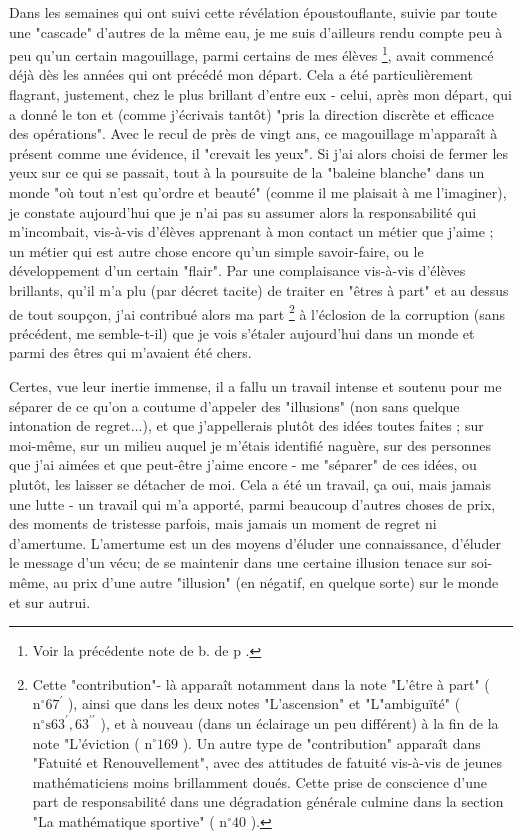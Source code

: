 Dans les semaines qui ont suivi cette révélation époustouflante, suivie par toute une "cascade" d'autres de la même eau, je me suis d'ailleurs rendu compte peu à peu qu'un certain magouillage, parmi certains de mes élèves \footnote{Voir la précédente note de b. de p .}, avait commencé déjà dès les années qui ont précédé mon départ. Cela a été particulièrement flagrant, justement, chez le plus brillant d'entre eux - celui, après mon départ, qui a donné le ton et (comme j'écrivais tantôt) "pris la direction discrète et efficace des opérations". Avec le recul de près de vingt ans, ce magouillage m'apparaît à présent comme une évidence, il "crevait les yeux". Si j'ai alors choisi de fermer les yeux sur ce qui se passait, tout à la poursuite de la "baleine blanche" dans un monde "où tout n'est qu'ordre et beauté" (comme il me plaisait à me l'imaginer), je constate aujourd'hui que je n'ai pas su assumer alors la responsabilité qui m'incombait, vis-à-vis d'élèves apprenant à mon contact un métier que j'aime ; un métier qui est autre chose encore qu'un simple savoir-faire, ou le développement d'un certain "flair". Par une complaisance vis-à-vis d'élèves brillants, qu'il m'a plu (par décret tacite) de traiter en "êtres à part" et au dessus de tout soupçon, j'ai contribué alors ma part \footnote{Cette "contribution"- là apparaît notamment dans la note "L'être à part" ( $\mathrm{n}^{\circ} 67^{\prime}$ ), ainsi que dans les deux notes "L'ascension" et "L"ambiguïté" ( $\mathrm{n}^{\circ} \mathrm{s} 63^{\prime}, 63^{\prime \prime}$ ), et à nouveau (dans un éclairage un peu différent) à la fin de la note "L'éviction ( $\mathrm{n}^{\circ} 169$ ). Un autre type de "contribution" apparaît dans "Fatuité et Renouvellement", avec des attitudes de fatuité vis-à-vis de jeunes mathématiciens moins brillamment doués. Cette prise de conscience d'une part de responsabilité dans une dégradation générale culmine dans la section "La mathématique sportive" ( $\mathrm{n}^{\circ} 40$ ).} à l'éclosion de la corruption (sans précédent, me semble-t-il) que je vois s'étaler aujourd'hui dans un monde et parmi des êtres qui m'avaient été chers.

Certes, vue leur inertie immense, il a fallu un travail intense et soutenu pour me séparer de ce qu'on a coutume d'appeler des "illusions" (non sans quelque intonation de regret...), et que j'appellerais plutôt des idées toutes faites ; sur moi-même, sur un milieu auquel je m'étais identifié naguère, sur des personnes que j'ai aimées et que peut-être j’aime encore - me "séparer" de ces idées, ou plutôt, les laisser se détacher de moi. Cela a été un travail, ça oui, mais jamais une lutte - un travail qui m'a apporté, parmi beaucoup d'autres choses de prix, des moments de tristesse parfois, mais jamais un moment de regret ni d'amertume. L'amertume est un des moyens d'éluder une connaissance, d'éluder le message d'un vécu; de se maintenir dans une certaine illusion tenace sur soi-même, au prix d'une autre "illusion" (en négatif, en quelque sorte) sur le monde et sur autrui.

